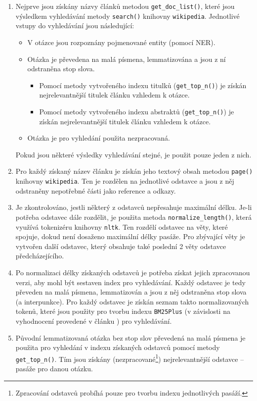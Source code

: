 \begin{enumerate}
    \item Nejprve jsou získány názvy článků metodou \texttt{get\_doc\_list()}, které jsou výsledkem vyhledávání metody \texttt{search()} knihovny \texttt{wikipedia}. Jednotlivé vstupy do vyhledávání jsou následující:
    \begin{itemize}
        \item V otázce jsou rozpoznány pojmenované entity (pomocí NER).
        \item Otázka je převedena na malá písmena, lemmatizována a jsou z ní odstraněna stop slova.
        \begin{itemize}
            \item Pomocí metody vytvořeného indexu titulků (\texttt{get\_top\_n()}) je získán nejrelevantnější titulek článku vzhledem k otázce.
            \item Pomocí metody vytvořeného indexu abstraktů (\texttt{get\_top\_n()}) je získán nejrelevantnější titulek článku vzhledem k otázce.
        \end{itemize}
        \item Otázka je pro vyhledání použita nezpracovaná.
    \end{itemize}
    Pokud jsou některé výsledky vyhledávání stejné, je použit pouze jeden z nich.
    
    \item Pro každý získaný název článku je získán jeho textový obsah metodou \texttt{page()} kni\-hovny \texttt{wikipedia}. Ten je rozdělen na jednotlivé odstavce a jsou z něj odstraněny nepotřebné části jako reference a odkazy.
    
    \item Je zkontrolováno, jestli některý z odstavců nepřesahuje maximální délku. Je-li potřeba odstavec dále rozdělit, je použita metoda \texttt{normalize\_length()}, která využívá tokenizéru knihovny \texttt{nltk}. Ten rozdělí odstavec na věty, které spojuje, dokud není dosaženo maximální délky pasáže. Pro zbývající věty je vytvořen další odstavec, který obsahuje také poslední 2 věty odstavce předcházejícího.
    
    \item Po normalizaci délky získaných odstavců je potřeba získat jejich zpracovanou verzi, aby mohl být sestaven index pro vyhledávání. Každý odstavec je tedy převeden na malá písmena, lemmatizován a jsou z něj odstraněna stop slova (a interpunkce). Pro každý odstavec je získán seznam takto normalizovaných tokenů, které jsou použity pro tvorbu indexu \texttt{BM25Plus} (v závislosti na vyhodnocení provedené v článku \cite{bm25_improvements}) pro vyhledávání.
    
    \item Původní lemmatizovaná otázka bez stop slov převedená na malá písmena je použita pro vyhledání v indexu získaných odstavců pomocí metody \texttt{get\_top\_n()}. Tím jsou získány (nezpracované\footnote{Zpracování odstavců probíhá pouze pro tvorbu indexu jednotlivých pasáží.}) nejrelevantnější odstavce -- pasáže pro danou otázku.
\end{enumerate}
\pagebreak
